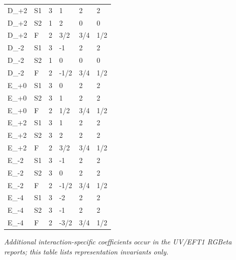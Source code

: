 \documentclass[10pt,a4paper]{article}
\begin{document}
\begin{longtable}{llllll}
D\_+2 & S1 & 3 & 1 & 2 & 2 \\
D\_+2 & S2 & 1 & 2 & 0 & 0 \\
D\_+2 & F & 2 & 3/2 & 3/4 & 1/2 \\
D\_-2 & S1 & 3 & -1 & 2 & 2 \\
D\_-2 & S2 & 1 & 0 & 0 & 0 \\
D\_-2 & F & 2 & -1/2 & 3/4 & 1/2 \\
E\_+0 & S1 & 3 & 0 & 2 & 2 \\
E\_+0 & S2 & 3 & 1 & 2 & 2 \\
E\_+0 & F & 2 & 1/2 & 3/4 & 1/2 \\
E\_+2 & S1 & 3 & 1 & 2 & 2 \\
E\_+2 & S2 & 3 & 2 & 2 & 2 \\
E\_+2 & F & 2 & 3/2 & 3/4 & 1/2 \\
E\_-2 & S1 & 3 & -1 & 2 & 2 \\
E\_-2 & S2 & 3 & 0 & 2 & 2 \\
E\_-2 & F & 2 & -1/2 & 3/4 & 1/2 \\
E\_-4 & S1 & 3 & -2 & 2 & 2 \\
E\_-4 & S2 & 3 & -1 & 2 & 2 \\
E\_-4 & F & 2 & -3/2 & 3/4 & 1/2 \\
\bottomrule
\end{longtable}
\emph{Additional interaction-specific coefficients occur in the UV/EFT1 RGBeta reports; this table lists representation invariants only.}
\end{document}

